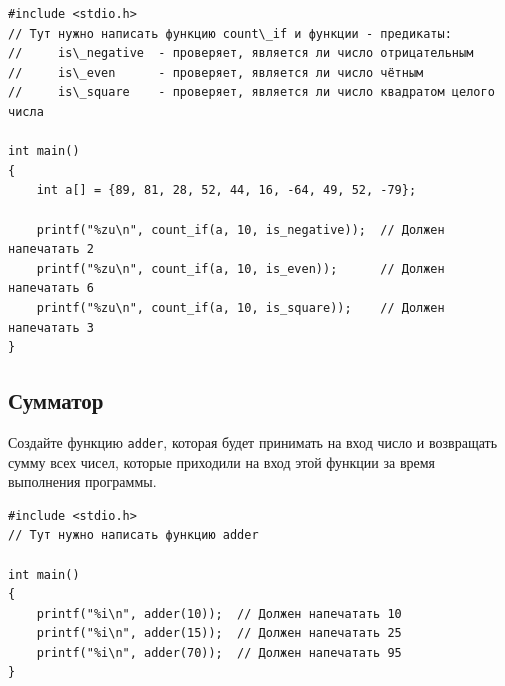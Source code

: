 \documentclass[10pt]{article}
\begin{document}
\begin{lstlisting}
#include <stdio.h>
// Тут нужно написать функцию count\_if и функции - предикаты:
//     is\_negative  - проверяет, является ли число отрицательным
//     is\_even      - проверяет, является ли число чётным
//     is\_square    - проверяет, является ли число квадратом целого числа

int main()
{
    int a[] = {89, 81, 28, 52, 44, 16, -64, 49, 52, -79};
    
    printf("%zu\n", count_if(a, 10, is_negative));  // Должен напечатать 2
    printf("%zu\n", count_if(a, 10, is_even));      // Должен напечатать 6
    printf("%zu\n", count_if(a, 10, is_square));    // Должен напечатать 3
}

\end{lstlisting}

\subsection{Сумматор}
Создайте функцию \texttt{adder}, которая будет принимать на вход число и возвращать сумму всех чисел, которые приходили на вход этой функции за время выполнения программы.
\begin{lstlisting}
#include <stdio.h>
// Тут нужно написать функцию adder

int main()
{
    printf("%i\n", adder(10));  // Должен напечатать 10
    printf("%i\n", adder(15));  // Должен напечатать 25
    printf("%i\n", adder(70));  // Должен напечатать 95
}
\end{lstlisting}
\end{document}
